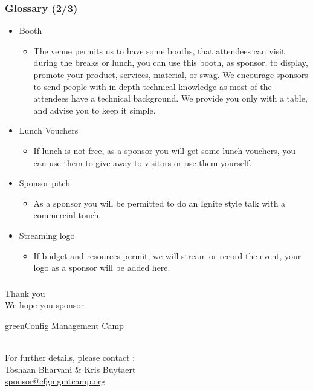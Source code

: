 \begin{frame}
\frametitle{Glossary (2/3)}
\begin{itemize}
	\item<+->
	Booth
	\begin{itemize}
		\item<+->
		The venue permits us to have some booths, that attendees can visit during the breaks or lunch, you can use this booth, as sponsor, to display, promote your product, services, material, or swag.
		We encourage sponsors to send people with in-depth technical knowledge as most of the attendees have a technical background.
		We provide you only with a table, and advise you to keep it simple.
	\end{itemize}
	\item<+->
	Lunch Vouchers
	\begin{itemize}
		\item<+->
		If lunch is not free, as a sponsor you will get some lunch vouchers, you can use them to give away to visitors or use them yourself.
	\end{itemize}
	\item<+->
	Sponsor pitch
	\begin{itemize}
		\item<+->
		As a sponsor you will be permitted to do an Ignite style talk with a commercial touch.
	\end{itemize}
	\item<+->
	Streaming logo
	\begin{itemize}
		\item<+->
		If budget and resources permit, we will stream or record the event, your logo as a sponsor will be added here.
	\end{itemize}
\end{itemize}
\end{frame}
%
\begin{frame}
\frametitle{}
\begin{center}
	\Huge{Thank you} \\
	\Huge{We hope you sponsor} \\
	\Huge{\begin{color}{green}Config Management Camp\end{color}} \\
	\normalsize{For further details, please contact :} \\
	\Large{Toshaan Bharvani \& Kris Buytaert} \\
	\Large{\href{mailto:sponsor@cfgmgmtcamp.org}{sponsor@cfgmgmtcamp.org}}
\end{center}
\end{frame}


